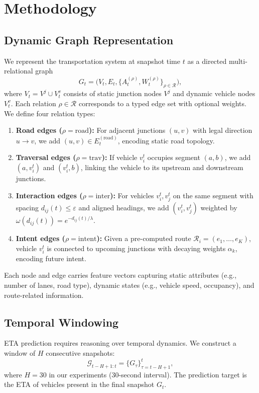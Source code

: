 \section{Methodology}

\subsection{Dynamic Graph Representation}
We represent the transportation system at snapshot time $t$ as a directed multi-relational graph
\[
G_t = \big(V_t, E_t, \{A_t^{(\rho)}, W_t^{(\rho)}\}_{\rho\in\mathcal{R}}\big),
\]
where $V_t = V^j \cup V_t^v$ consists of static junction nodes $V^j$ and dynamic vehicle nodes $V_t^v$. 
Each relation $\rho\in\mathcal{R}$ corresponds to a typed edge set with optional weights. 
We define four relation types:
\begin{enumerate}
    \item \textbf{Road edges ($\rho=\text{road}$):} For adjacent junctions $(u,v)$ with legal direction $u\!\to\!v$, we add $(u,v)\in E_t^{(\text{road})}$, encoding static road topology.
    \item \textbf{Traversal edges ($\rho=\text{trav}$):} If vehicle $v_i^t$ occupies segment $(a,b)$, we add $(a,v_i^t)$ and $(v_i^t,b)$, linking the vehicle to its upstream and downstream junctions.
    \item \textbf{Interaction edges ($\rho=\text{inter}$):} For vehicles $v_i^t,v_j^t$ on the same segment with spacing $d_{ij}(t)\le\varepsilon$ and aligned headings, we add $(v_i^t,v_j^t)$ weighted by $\omega(d_{ij}(t)) = e^{-d_{ij}(t)/\lambda}$.
    \item \textbf{Intent edges ($\rho=\text{intent}$):} Given a pre-computed route $\mathcal{R}_i = (e_1,\ldots,e_K)$, vehicle $v_i^t$ is connected to upcoming junctions with decaying weights $\alpha_k$, encoding future intent.
\end{enumerate}

Each node and edge carries feature vectors capturing static attributes (e.g., number of lanes, road type), dynamic states (e.g., vehicle speed, occupancy), and route-related information.

\subsection{Temporal Windowing}
ETA prediction requires reasoning over temporal dynamics. We construct a window of $H$ consecutive snapshots:
\[
\mathcal{G}_{t-H+1:t} = \{G_\tau\}_{\tau=t-H+1}^t,
\]
where $H=30$ in our experiments (30-second interval). The prediction target is the ETA of vehicles present in the final snapshot $G_t$.

